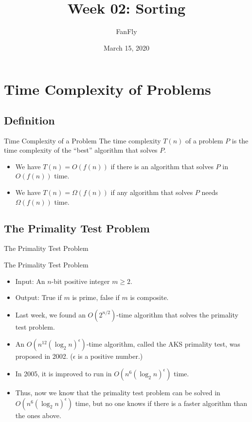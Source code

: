 \documentclass{beamer}
\title{Week 02: Sorting}
\author{FanFly}
\date{March 15, 2020}
\begin{document}
\begin{frame}
  \titlepage
\end{frame}

\section{Time Complexity of Problems}
\subsection{Definition}
\begin{frame}{Time Complexity of a Problem}
  The time complexity $T(n)$ of a problem $P$ is the time complexity of the
  ``best'' algorithm that solves $P$. \pause
  \begin{itemize}
    \item We have $T(n) = O(f(n))$
    if there is an algorithm that solves $P$ in $O(f(n))$ time. \pause
    \item We have $T(n) = \Omega(f(n))$
    if any algorithm that solves $P$ needs $\Omega(f(n))$ time.
  \end{itemize}
\end{frame}

\subsection{The Primality Test Problem}
\begin{frame}{The Primality Test Problem}
  \begin{block}{The Primality Test Problem}
    \begin{itemize}
      \item Input: An $n$-bit positive integer $m \geq 2$.
      \item Output: True if $m$ is prime, false if $m$ is composite. \pause
    \end{itemize}
  \end{block}
  \begin{itemize}
    \item Last week, we found an $O(2^{n/2})$-time algorithm that solves the
    primality test problem. \pause
    \item An $O(n^{12}(\log_2 n)^\epsilon)$-time algorithm, called the AKS
    primality test, was proposed in 2002.
    ($\epsilon$ is a positive number.) \pause
    \item In 2005, it is improved to run in $O(n^6(\log_2 n)^\epsilon)$ time.
    \pause
    \item Thus, now we know that the primality test problem can be solved in
    $O(n^6(\log_2 n)^\epsilon)$ time, but no one knows if there is a faster
    algorithm than the ones above.
  \end{itemize}
\end{frame}
\end{document}
